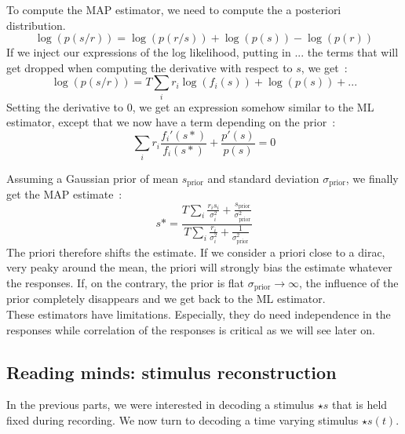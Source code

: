 \documentclass[10pt,a4paper]{article}
\begin{document}
To compute the MAP estimator, we need to compute the a posteriori
distribution.\\
\begin{equation}
\log(p(s/r)) = \log(p(r/s)) + \log(p(s)) - \log(p(r))
\end{equation}
If we inject our expressions of the log likelihood, putting in $...$
the terms that will get dropped when computing the derivative with
respect to $s$, we get~:
\begin{equation}
\log(p(s/r)) = T \sum_i r_i \log(f_i(s)) + \log(p(s)) + ...
\end{equation}
Setting the derivative to $0$, we get an expression somehow similar to
the ML estimator, except that we now have a term depending on the
prior~:
\begin{equation}
\sum_i r_i \frac{f_i'(s*)}{f_i(s*)} + \frac{p'(s)}{p(s)} = 0
\end{equation}

Assuming a Gaussian prior of mean $s_{\mbox{prior}}$ and standard
deviation $\sigma_{\mbox{prior}}$, we finally get the MAP estimate~:
\begin{equation}
s* = \frac{T \sum_i \frac{r_i s_i}{\sigma_i^2} +
  \frac{s_{\mbox{prior}}}{\sigma_{\mbox{prior}}^2}}{T\sum_i
  \frac{r_i}{\sigma_i^2} + \frac{1}{\sigma_{\mbox{prior}}^2}}
\end{equation}
The priori therefore shifts the estimate. If we consider a priori
close to a dirac, very peaky around the mean, the priori will strongly
bias the estimate whatever the responses. If, on the contrary, the
prior is flat $\sigma_{\mbox{prior}} \rightarrow \infty$, the
influence of the prior completely disappears and we get back to the ML
estimator.\\

These estimators have limitations. Especially, they do need
independence in the responses while correlation of the responses is
critical as we will see later on.\\

\subsection{Reading minds: stimulus reconstruction}

In the previous parts, we were interested in decoding a stimulus
$\star{s}$ that is held fixed during recording. We now turn to
decoding a time varying stimulus $\star{s}(t)$.\\
\end{document}
